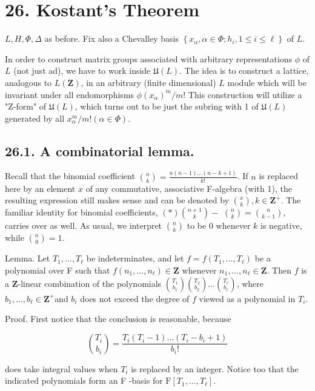 \documentclass[10pt]{article}
\begin{document}
\section*{26. Kostant's Theorem}
$L, H, \Phi, \Delta$ as before. Fix also a Chevalley basis $\left\{x_{\alpha}, \alpha \in \Phi ; h_{i}, 1 \leq i \leq \ell\right\}$ of $L$.

In order to construct matrix groups associated with arbitrary representations $\phi$ of $L$ (not just ad), we have to work inside $\mathfrak{U}(L)$. The idea is to construct a lattice, analogous to $L(\mathbf{Z})$, in an arbitrary (finite dimensional) $L$ module which will be invariant under all endomorphisms $\phi\left(x_{\alpha}\right)^{m} / m!$ This construction will utilize a "Z-form" of $\mathfrak{U}(L)$, which turns out to be just the subring with 1 of $\mathfrak{U}(L)$ generated by all $x_{\alpha}^{m} / m!(\alpha \in \Phi)$.

\subsection*{26.1. A combinatorial lemma.}
Recall that the binomial coefficient $\binom{n}{k}=\frac{n(n-1) \ldots(n-k+1)}{k!}$. If $n$ is replaced here by an element $x$ of any commutative, associative F-algebra (with 1), the resulting expression still makes sense and can be denoted by $\binom{x}{k}, k \in \mathbf{Z}^{+}$. The familiar identity for binomial coefficients, $(*)\binom{n+1}{k}-$ $\binom{n}{k}=\binom{n}{k-1}$, carries over as well. As usual, we interpret $\binom{n}{k}$ to be 0 whenever $k$ is negative, while $\binom{n}{0}=1$.

Lemma. Let $T_{1}, \ldots, T_{\ell}$ be indeterminates, and let $f=f\left(T_{1}, \ldots, T_{\ell}\right)$ be a polynomial over F such that $f\left(n_{1}, \ldots, n_{\ell}\right) \in \mathbf{Z}$ whenever $n_{1}, \ldots, n_{\ell} \in \mathbf{Z}$. Then $f$ is a $\mathbf{Z}$-linear combination of the polynomials $\binom{T_{1}}{b_{1}}\binom{T_{2}}{b_{2}} \ldots\binom{T_{\ell}}{b_{\ell}}$, where $b_{1}, \ldots, b_{\ell} \in \mathbf{Z}^{+}$and $b_{i}$ does not exceed the degree of $f$ viewed as a polynomial in $T_{i}$.

Proof. First notice that the conclusion is reasonable, because

$$
\binom{T_{i}}{b_{i}}=\frac{T_{i}\left(T_{i}-1\right) \ldots\left(T_{i}-b_{i}+1\right)}{b_{i}!}
$$

does take integral values when $T_{i}$ is replaced by an integer. Notice too that the indicated polynomials form an F -basis for $\mathrm{F}\left[T_{1}, \ldots, T_{\ell}\right]$.
\end{document}
